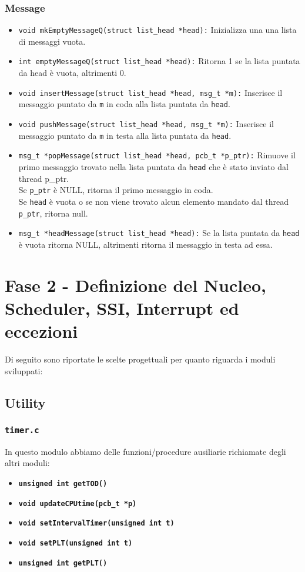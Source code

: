 \documentclass{article}
\begin{document}
\subsubsection{Message}
\begin{itemize}
    \item \texttt{void mkEmptyMessageQ(struct list\_head *head):}  Inizializza una una lista di messaggi vuota.
    \item \texttt{int emptyMessageQ(struct list_head *head):} Ritorna 1 se la lista puntata da head è vuota, altrimenti 0.
    
    \item \texttt{void insertMessage(struct list\_head *head, msg\_t *m):} Inserisce il messaggio puntato da \texttt{m} in coda alla lista puntata da \texttt{head}.
    \item \texttt{void pushMessage(struct list\_head *head, msg\_t *m):} Inserisce il messaggio puntato da \texttt{m} in testa alla lista puntata da \texttt{head}.
    \item \texttt{msg\_t *popMessage(struct list\_head *head, pcb\_t *p\_ptr):} Rimuove il primo messaggio trovato nella lista puntata da \texttt{head} che è stato inviato dal thread p\_ptr.\\
    Se \texttt{p\_ptr} è NULL, ritorna il primo messaggio in coda. \\
    Se \texttt{head} è vuota o se non viene trovato alcun elemento mandato dal thread \texttt{p\_ptr}, ritorna null.
    \item \texttt{msg\_t *headMessage(struct list\_head *head):} Se la lista puntata da \texttt{head} è vuota ritorna NULL, altrimenti ritorna il messaggio in testa ad essa.
\end{itemize}

\newpage

\section{Fase 2 - Definizione del Nucleo, Scheduler, SSI, Interrupt ed eccezioni}
Di seguito sono riportate le scelte progettuali per quanto riguarda i moduli sviluppati:

\subsection{Utility}
\subsubsection{\texttt{\textbf{timer.c}}}
In questo modulo abbiamo delle funzioni/procedure ausiliarie richiamate degli altri moduli:
\begin{itemize}
    \item \texttt{\textbf{unsigned int getTOD()}}
    \item \texttt{\textbf{void updateCPUtime(pcb\_t *p)}}
    \item \texttt{\textbf{void setIntervalTimer(unsigned int t)}}
    \item \texttt{\textbf{void setPLT(unsigned int t)}}
    \item \texttt{\textbf{unsigned int getPLT()}}
\end{itemize}
\end{document}
